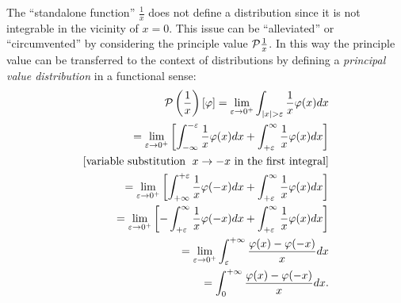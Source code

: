 The ``standalone function'' $\frac{1}{x}$
does not define a distribution  since it is not integrable in
the vicinity of $x=0$.
This issue can be ``alleviated'' or ``circumvented''  by considering the principle value  ${\cal P}\frac{1}{x}$.
In this way the
principle value can be transferred to the context of distributions
by defining
a {\em principal value distribution} in a functional sense:
\begin{equation}
\begin{split}
{\cal P} \left(\frac{1}{x}\right) \left[\varphi\right]
=
\lim_{\varepsilon \rightarrow 0^+}
\int_{ \vert x \vert > \varepsilon }   \frac{1}{x}\varphi(x) dx
\\
= \lim_{\varepsilon \rightarrow 0^+}
\left[
\int_{-\infty}^{ -\varepsilon} \frac{1}{x}\varphi(x) dx
+
\int_{ +\varepsilon}^{\infty} \frac{1}{x}\varphi(x) dx
\right]
\\
[\textrm{variable substitution } \; x\rightarrow -x \textrm{ in the first integral}]
\\
= \lim_{\varepsilon \rightarrow 0^+}
\left[
\int_{+\infty}^{ +\varepsilon} \frac{1}{x}\varphi(-x) dx
+
\int_{ +\varepsilon}^{\infty} \frac{1}{x}\varphi(x) dx
\right]
\\
= \lim_{\varepsilon \rightarrow 0^+}
\left[
-\int_{ +\varepsilon}^{\infty} \frac{1}{x}\varphi(-x) dx
+
\int_{ +\varepsilon}^{\infty} \frac{1}{x}\varphi(x) dx
\right]
\\
=
\lim_{\varepsilon \rightarrow 0^+}
\int_{\varepsilon}^{+\infty}   \frac{\varphi(x)-\varphi(-x)}{x} dx
\\
=
\int_{0}^{+\infty}   \frac{\varphi(x)-\varphi(-x)}{x} dx
.
\end{split}
\label{2012-m-ch-di-prinvaldi}
\end{equation}



